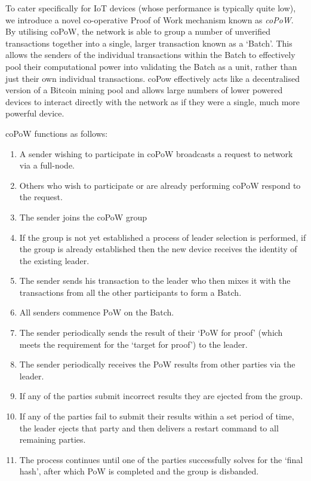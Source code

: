 \documentclass[a4paper,10pt,twocolumn]{article}
\begin{document}
	To cater specifically for IoT devices (whose performance is typically quite low), we introduce a novel co-operative Proof of Work 
	mechanism known as \emph{coPoW}. By utilising coPoW, the network is able to group a number of unverified transactions together into a 
	single, larger transaction known as a `Batch'. This allows the senders of the individual transactions within the Batch to effectively 
	pool their computational power into validating the Batch as a unit, rather than just their own individual transactions.
	coPow effectively acts like a decentralised version of a Bitcoin mining pool and allows large numbers of lower powered devices to interact directly with the network as if they were a single, much more powerful device.
	
	\vspace{2.5mm}
	
	coPoW functions as follows:
	
	\vspace{-0.5\baselineskip}
	\begin{enumerate}
		\setlength\itemsep{0em}
		\item A sender wishing to participate in coPoW broadcasts a request to network via a full-node.
		\item Others who wish to participate or are already performing coPoW respond to the request.
		\item The sender joins the coPoW group
		\item If the group is not yet established a process of leader selection is performed, if the group is already established then 
		the new device receives the identity of the existing leader.
		\item The sender sends his transaction to the leader who then mixes it with the transactions from all the other participants to 
		form a Batch.
		\item All senders commence PoW on the Batch.
		\item The sender periodically sends the result of their `PoW for proof' (which meets the requirement for the `target for proof') to the leader.
		\item The sender periodically receives the PoW results from other parties via the leader. 
		\item If any of the parties submit incorrect results they are ejected from the group.
		\item If any of the parties fail to submit their results within a set period of time, the leader ejects that party and then 
		delivers a restart command to all remaining parties.
		\item The process continues until one of the parties successfully solves for the `final hash', after which PoW is completed and 
		the group is disbanded.
	\end{enumerate}
	
\end{document}
